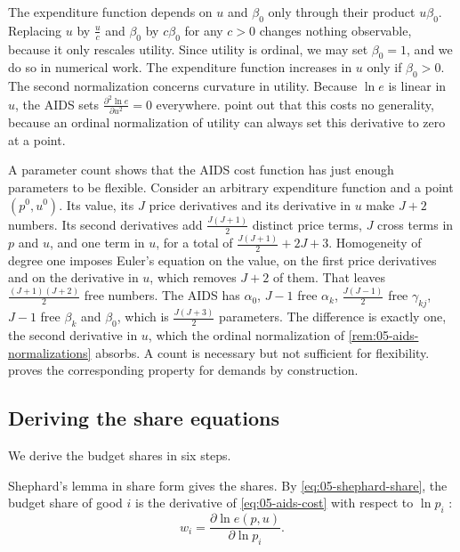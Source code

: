 \begin{remark}\label{rem:05-aids-normalizations}
The expenditure function depends on $u$ and $\beta_0$ only through their product $u\beta_0$. Replacing $u$ by
$\frac{u}{c}$ and $\beta_0$ by $c\beta_0$ for any $c > 0$ changes nothing observable, because it only
rescales utility. Since utility is ordinal, we may set $\beta_0 = 1$, and we do so in numerical work. The
expenditure function increases in $u$ only if $\beta_0 > 0$. The second normalization concerns curvature in
utility. Because $\ln e$ is linear in $u$, the AIDS sets $\frac{\partial^2\ln e}{\partial u^2} = 0$
everywhere. \citet[p.~313]{DeatonMuellbauer1980a} point out that this costs no generality, because an
ordinal normalization of utility can always set this derivative to zero at a point.
\end{remark}

A parameter count shows that the AIDS cost function has just enough parameters to be flexible. Consider an
arbitrary expenditure function and a point $(p^0, u^0)$. Its value, its $J$ price derivatives and its
derivative in $u$ make $J + 2$ numbers. Its second derivatives add $\frac{J(J+1)}{2}$ distinct price terms,
$J$ cross terms in $p$ and $u$, and one term in $u$, for a total of $\frac{J(J+1)}{2} + 2J + 3$. Homogeneity of
degree one imposes Euler's equation on the value, on the first price derivatives and on the derivative in
$u$, which removes $J + 2$ of them. That leaves $\frac{(J+1)(J+2)}{2}$ free numbers. The AIDS has
$\alpha_0$, $J - 1$ free $\alpha_k$, $\frac{J(J-1)}{2}$ free $\gamma_{kj}$, $J - 1$ free $\beta_k$ and
$\beta_0$, which is $\frac{J(J+3)}{2}$ parameters. The difference is exactly one, the second derivative in
$u$, which the ordinal normalization of \cref{rem:05-aids-normalizations} absorbs. A count is necessary but
not sufficient for flexibility.  proves the corresponding property for demands by
construction.

\subsection{Deriving the share equations}\label{sec:05-aids-shares}

We derive the budget shares in six steps.

 Shephard's lemma in share form gives the shares. By \eqref{eq:05-shephard-share}, the budget share of good $i$
is the derivative of \eqref{eq:05-aids-cost} with respect to $\ln p_i$
\citep[eq.~5]{DeatonMuellbauer1980a}:
\begin{equation*}
w_i = \frac{\partial\ln e(p, u)}{\partial\ln p_i}.
\end{equation*}

